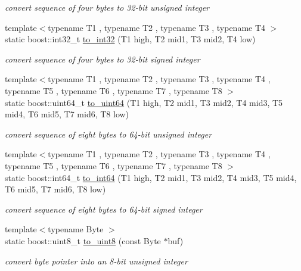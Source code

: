 \begin{DoxyCompactItemize}
\begin{DoxyCompactList}\small\item\em convert sequence of four bytes to 32-\/bit unsigned integer \end{DoxyCompactList}\item 
{\footnotesize template$<$typename T1 , typename T2 , typename T3 , typename T4 $>$ }\\static boost\-::int32\-\_\-t \hyperlink{structpion_1_1algorithm_abad3afe7cdb40f779cac637f3e28702c}{to\-\_\-int32} (T1 high, T2 mid1, T3 mid2, T4 low)
\begin{DoxyCompactList}\small\item\em convert sequence of four bytes to 32-\/bit signed integer \end{DoxyCompactList}\item 
{\footnotesize template$<$typename T1 , typename T2 , typename T3 , typename T4 , typename T5 , typename T6 , typename T7 , typename T8 $>$ }\\static boost\-::uint64\-\_\-t \hyperlink{structpion_1_1algorithm_adae7fcd4321444d86e98acf5796ecadd}{to\-\_\-uint64} (T1 high, T2 mid1, T3 mid2, T4 mid3, T5 mid4, T6 mid5, T7 mid6, T8 low)
\begin{DoxyCompactList}\small\item\em convert sequence of eight bytes to 64-\/bit unsigned integer \end{DoxyCompactList}\item 
{\footnotesize template$<$typename T1 , typename T2 , typename T3 , typename T4 , typename T5 , typename T6 , typename T7 , typename T8 $>$ }\\static boost\-::int64\-\_\-t \hyperlink{structpion_1_1algorithm_a559bde18e9670cefd4c4937394f2c82c}{to\-\_\-int64} (T1 high, T2 mid1, T3 mid2, T4 mid3, T5 mid4, T6 mid5, T7 mid6, T8 low)
\begin{DoxyCompactList}\small\item\em convert sequence of eight bytes to 64-\/bit signed integer \end{DoxyCompactList}\item 
{\footnotesize template$<$typename Byte $>$ }\\static boost\-::uint8\-\_\-t \hyperlink{structpion_1_1algorithm_a60bfca7cfacf90a664a4977cd70ccf68}{to\-\_\-uint8} (const Byte $\ast$buf)
\begin{DoxyCompactList}\small\item\em convert byte pointer into an 8-\/bit unsigned integer \end{DoxyCompactList}\item 

\end{DoxyCompactItemize}
